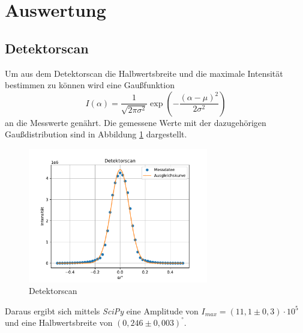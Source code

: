 \section{Auswertung}
\label{sec:Auswertung}

\subsection{Detektorscan}
 Um aus dem Detektorscan die Halbwertsbreite 
 und die maximale Intensität bestimmen zu können wird eine Gaußfunktion
 \begin{equation}
     I(\alpha) = \frac{1}{\sqrt{2\pi \sigma^2}}\exp\left(-\frac{(\alpha - \mu)^2}{2\sigma^2}\right)
 \end{equation} 
an die Messwerte genährt.
Die gemessene Werte mit der dazugehörigen Gaußdistribution sind in Abbildung \ref{fig:gauß} dargestellt.
\begin{figure}[ht]
    \centering
    \includegraphics[width = 0.7\textwidth]{Auswertung/Graphen/Detektorscan.pdf}
    \caption{Detektorscan}
    \label{fig:gauß}
\end{figure}
Daraus ergibt sich mittels \textit{SciPy} \cite{scipy} eine Amplitude  von $I_{max} =(11,1\pm 0,3) \cdot 10^5$ 
und eine Halbwertsbreite von $(0,246 \pm 0,003)^°$.



